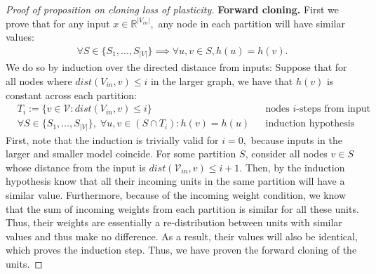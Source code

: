 \documentclass{article}
\newcommand{\R}{\mathbb{R}}
\begin{document}
\begin{proof}[Proof of proposition on cloning loss of plasticity]
    \textbf{Forward cloning.} First we prove that for any input $x \in \R^{|V_{in}|},$ any node in each partition will have similar values:
    \begin{align*}
        \forall S \in \{S_1,\dots,S_{|V|}\} \implies \forall u,v \in S, h(u) = h(v). 
    \end{align*}
    We do so by induction over the directed distance from inputs:
    Suppose that for all nodes where $dist(V_{in},v) \le i$ in the larger graph, we have that $h(v)$ is constant across each partition: 
    \begin{align*}
        &T_i:= \{v\in \mathcal{V}: dist(V_{in},v) \le i\} && \text{nodes $i$-steps from input}\\
        &\forall S \in \{S_1,\dots,S_{|V|}\}, \; \forall u,v \in (S\cap T_i): h(v) = h(u)  && \text{induction hypothesis}
    \end{align*}
    First, note that the induction is trivially valid for $i=0,$ because inputs in the larger and smaller model coincide. 
    For some partition $S$, consider all nodes $v \in S$ whose distance from the input is $dist(\mathcal{V}_{in},v) \le i+1.$ Then, by the induction hypothesis know that all their incoming units in the same partition will have a similar value. Furthermore, because of the incoming weight condition, we know that the sum of incoming weights from each partition is similar for all these units. Thus, their weights are essentially a re-distribution between units with similar values and thus make no difference. As a result, their values will also be identical, which proves the induction step. Thus, we have proven the forward cloning of the units. 
    

\end{proof}
\end{document}
